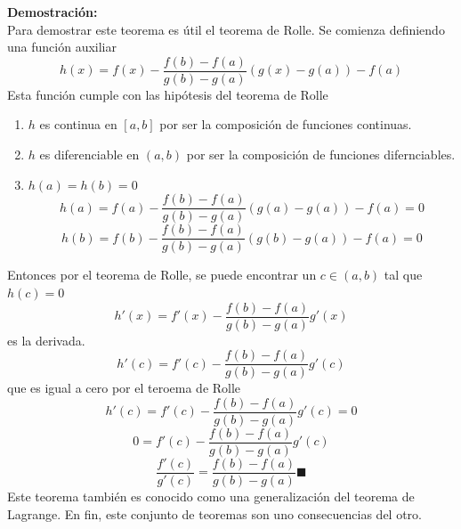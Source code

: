 \documentclass[10pt,twoside]{SelfArx} %
\begin{document}
 \textbf{Demostración:}\\
 Para demostrar este teorema es útil el teorema de Rolle. Se comienza definiendo una función auxiliar
 \begin{equation}
 h(x)=f(x)-\dfrac{f(b)-f(a)}{g(b)-g(a)}\left (g(x)-g(a)\right )-f(a)
 \end{equation}
 Esta función cumple con las hipótesis del teorema de Rolle
 \begin{enumerate}
 \item $ h $	 es continua en $ [a,b] $ por ser la composición de funciones continuas.
 \item $ h $ es diferenciable en $ (a,b) $ por ser la composición de funciones difernciables.
 \item $ h(a)=h(b)=0 $
 \[  h(a)=f(a)-\dfrac{f(b)-f(a)}{g(b)-g(a)}\left (g(a)-g(a)\right )-f(a)=0 \]
 \[  h(b)=f(b)-\dfrac{f(b)-f(a)}{g(b)-g(a)}\left (g(b)-g(a)\right )-f(a)=0 \]
 \end{enumerate}
 Entonces por el teorema de Rolle, se puede encontrar un $ c\in(a,b) $ tal que $ h(c)=0 $
 \begin{equation}
  h'(x)=f'(x)-\dfrac{f(b)-f(a)}{g(b)-g(a)}g'(x)
 \end{equation}
 es la derivada.
 \begin{equation}
  h'(c)=f'(c)-\dfrac{f(b)-f(a)}{g(b)-g(a)}g'(c)
 \end{equation}
 que es igual a cero por el teroema de Rolle
 \begin{equation}
  h'(c)=f'(c)-\dfrac{f(b)-f(a)}{g(b)-g(a)}g'(c)=0
 \end{equation}
 \begin{equation}
0=f'(c)-\dfrac{f(b)-f(a)}{g(b)-g(a)}g'(c)
 \end{equation}
 \begin{equation}
\dfrac{f'(c)}{g'(c)}=\dfrac{f(b)-f(a)}{g(b)-g(a)}\blacksquare
 \end{equation}
 Este teorema también es conocido como una generalización del teorema de Lagrange. En fin, este conjunto de teoremas son uno consecuencias del otro.\\
 
 
\end{document}
